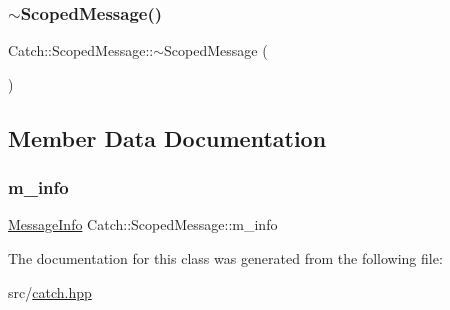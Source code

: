 \mbox{\label{class_catch_1_1_scoped_message_a43190843f9eeb84a0b42b0bc95fdf93a}} 
\subsubsection{\texorpdfstring{$\sim$\+Scoped\+Message()}{~ScopedMessage()}}
{\footnotesize\ttfamily Catch\+::\+Scoped\+Message\+::$\sim$\+Scoped\+Message (\begin{DoxyParamCaption}{ }\end{DoxyParamCaption})}



\subsection{Member Data Documentation}
\mbox{\label{class_catch_1_1_scoped_message_ae6e1476f389cc6e1586f033b3747b27b}} 
\subsubsection{\texorpdfstring{m\+\_\+info}{m\_info}}
{\footnotesize\ttfamily \hyperlink{struct_catch_1_1_message_info}{Message\+Info} Catch\+::\+Scoped\+Message\+::m\+\_\+info}



The documentation for this class was generated from the following file\+:\begin{DoxyCompactItemize}
\item 
src/\hyperlink{catch_8hpp}{catch.\+hpp}\end{DoxyCompactItemize}
